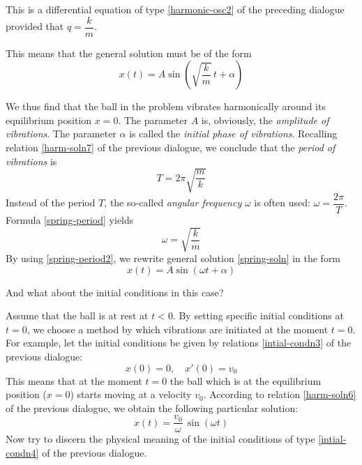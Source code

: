 \rdr This is a differential equation of type \eqref{harmonic-osc2} of the preceding dialogue provided that $q = \dfrac{k}{m}$.

\athr This means that the general solution must be of the form
\begin{equation}%
x(t)=A \sin \left( \sqrt{\dfrac{k}{m}} \, t + \alpha \right)
\label{spring-soln}
\end{equation}

We thus find that the ball in the problem vibrates harmonically around its equilibrium position $x = 0$. The parameter $A$ is, obviously, the \emph{amplitude of vibrations}. The parameter $\alpha$ is called the \emph{initial phase of vibrations}. Recalling relation \eqref{harm-soln7} of the previous dialogue, we conclude that the \emph{period of vibrations} is
\begin{equation}%
T = 2 \pi \sqrt{\dfrac{m}{k}}
\label{spring-period}
\end{equation}
Instead of the period $T$, the so-called \emph{angular frequency} $\omega$ is	often used: $\omega=	\dfrac{2 \pi}{T}$.	Formula \eqref{spring-period} yields
\begin{equation}%
\omega = \sqrt{\dfrac{k}{m}}
\label{spring-period2}
\end{equation}
By using \eqref{spring-period2}, we rewrite general solution \eqref{spring-soln} in the form
\begin{equation}%
x(t) = A \sin (\omega t + \alpha)
\label{spring-period2}
\end{equation}

\rdr And what about the initial conditions in this case? 

\athr Assume that the ball is at rest at $t < 0$. By
setting specific initial conditions at $t = 0$, we choose a method by which vibrations are initiated at the moment $t = 0$. For example, let the initial conditions be given by
relations \eqref{intial-condn3} of the previous dialogue: 
\begin{equation}%
x(0) = 0,	\quad x'(0) = v_{0}
\label{spring-initial-condn}
\end{equation}
This means that at the moment $t = 0$ the ball which is at the equilibrium position ($x = 0$) starts moving at a velocity $v_{0}$. According to relation \eqref{harm-soln6} of the previous dialogue, we obtain the following particular solution:
\begin{equation}%
x (t) = \dfrac{v_{0}}{\omega} \, \sin ( \omega t)	
\label{spring-soln2}
\end{equation}
Now try to discern the physical meaning of the initial conditions of type \eqref{intial-condn4} of the previous dialogue. 

